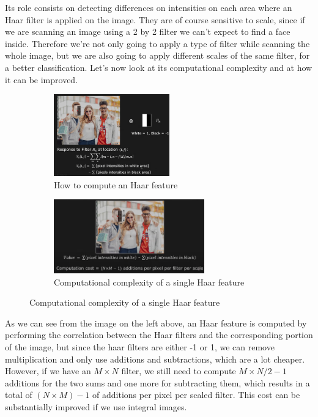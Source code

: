 \documentclass[12pt,a4paper]{article}
\begin{document}
\begin{large}
\begin{figure} [!hbp]
\begin{subfigure}[b]{0.4\textwidth}
    \end{subfigure}
  \end{figure}
Its role consists on detecting differences on intensities on each area where an Haar filter is applied on the image. They are of course sensitive to scale, since if we are scanning an image using a 2 by 2 filter we can't expect to find a face inside. Therefore we're not only going to apply a type of filter while scanning the whole image, but we are also going to apply different scales of the same filter, for a better classification. 
Let's now look at its computational complexity and at how it can be improved.
\begin{figure} [h!]
  \centering
    \begin{subfigure}[b]{0.3\textwidth}
    \centering
    \captionsetup{justification=centering}
      \includegraphics[width=5cm]{images/haar4.png}
      \caption{How to compute an Haar feature}
      
    \end{subfigure}
    \hspace{0.1cm}
    \begin{subfigure}[b]{0.4\textwidth}
    \centering
    \captionsetup{justification=centering}
      \includegraphics[width=6.5cm]{images/haar5.png}
      \caption{Computational complexity of a single Haar feature}
      
    \end{subfigure}
\end{figure}


As we can see from the image on the left above, an Haar feature is computed by performing the correlation between the Haar filters and the corresponding portion of the image, but since the haar filters are either -1 or 1, we can remove multiplication and only use additions and subtractions, which are a lot cheaper. However, if we have an $M\times N$ filter, we still need to compute $M\times N/2-1$ additions for the two sums and one more for subtracting them, which results in a total of $(N\times M)-1$ of additions per pixel per scaled filter.
This cost can be substantially improved if we use integral images.


\end{large}
\end{document}
